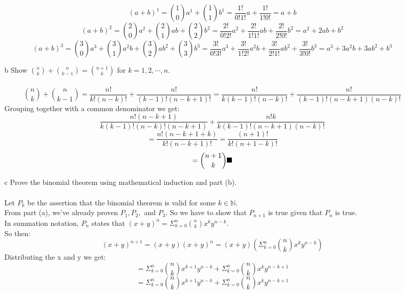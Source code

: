 \begin{itemize}
\begin{itemize}
      $$(a+b)^1 = \binom{1}{0}a^1 + \binom{1}{1}b^1 = \frac{1!}{0!1!}a + \frac{1!}{1!0!} = a + b$$
      $$(a+b)^2 = \binom{2}{0}a^2 + \binom{2}{1}ab + \binom{2}{2}b^2 = \frac{2!}{0!2!}a^2 + \frac{2!}{1!1!}ab + \frac{2!}{2!0!}b^2 = a^2 + 2ab + b^2$$
      $$(a+b)^3 = \binom{3}{0}a^3 + \binom{3}{1}a^2b + \binom{3}{2}ab^2 + \binom{3}{3}b^3 = \frac{3!}{0!3!}a^3 + \frac{3!}{1!2!}a^2b + \frac{3!}{2!1!}ab^2 + \frac{3!}{3!0!}b^3 = a^3 + 3a^2b + 3ab^2 + b^3$$
    \item [b]
      Show $\binom{n}{k} + \binom{n}{k-1} = \binom{n+1}{k}$ for $k = 1,2,\cdots, n$.\\\\

      $$\binom{n}{k} + \binom{n}{k-1} = \frac{n!}{k!(n-k)!} + \frac{n!}{(k-1)!(n-k+1)!} = \frac{n!}{k(k-1)!(n-k)!} + \frac{n!}{(k-1)!(n-k+1)(n-k)!}$$
      Grouping together with a common denominator we get:
      $$\frac{n!(n-k+1)}{k(k-1)!(n-k)!(n-k+1)} + \frac{n!k}{k(k-1)!(n-k+1)(n-k)!}$$
      $$=\frac{n!(n-k+1+k)}{k!(n-k+1)!} = \frac{(n+1)!}{k!(n+1-k)!}$$
      $$=\binom{n+1}{k} \qed$$

    \item [c]
      Prove the binomial theorem using mathematical induction and part (b).\\\\

      Let $P_k$ be the assertion that the binomial theorem is valid for some $k \in \mathds{N}$.\\
      From part (a), we've already proven $P_1, P_2,$ and $P_3$. So we have to show that $P_{n+1}$ is true given that $P_n$ is true.\\
      
      In summation notation, $P_n$ states that $(x+y)^n = \Sigma_{k=0}^n \binom{n}{k} x^ky^{n-k}$.\\
      So then:
      $$(x+y)^{n+1} = (x+y)(x+y)^n = (x+y)(\Sigma_{k=0}^n \binom{n}{k} x^ky^{n-k})$$
      Distributing the x and y we get:
      $$= \Sigma_{k=0}^n \binom{n}{k} x^{k+1}y^{n-k} + \Sigma_{k=0}^n \binom{n}{k} x^ky^{n-k+1}$$
      $$= \Sigma_{k=0}^n \binom{n}{k} x^{k+1}y^{n-k} + \Sigma_{k=0}^n \binom{n}{k} x^ky^{n-k+1}$$
    \end{itemize}
    
\end{itemize}


